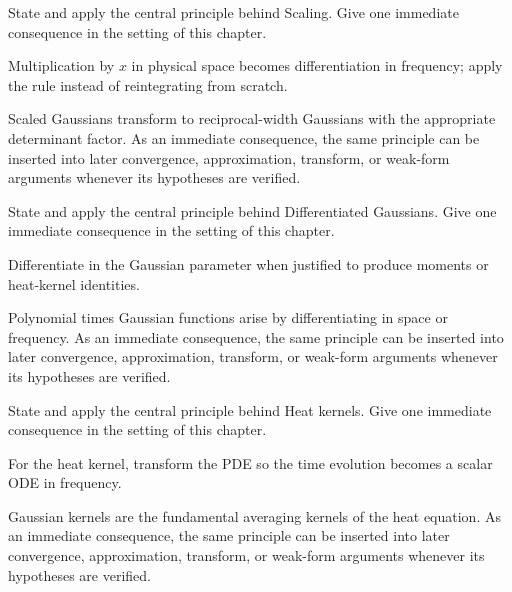 \begin{exercise}\label{exr:iii12-03}
State and apply the central principle behind Scaling. Give one immediate consequence in the setting of this chapter.
\end{exercise}
\begin{hint}
Multiplication by \(x\) in physical space becomes differentiation in frequency; apply the rule instead of reintegrating from scratch.
\end{hint}
\begin{solution}
Scaled Gaussians transform to reciprocal-width Gaussians with the appropriate determinant factor. As an immediate consequence, the same principle can be inserted into later convergence, approximation, transform, or weak-form arguments whenever its hypotheses are verified.
\end{solution}

\begin{exercise}\label{exr:iii12-04}
State and apply the central principle behind Differentiated Gaussians. Give one immediate consequence in the setting of this chapter.
\end{exercise}
\begin{hint}
Differentiate in the Gaussian parameter when justified to produce moments or heat-kernel identities.
\end{hint}
\begin{solution}
Polynomial times Gaussian functions arise by differentiating in space or frequency. As an immediate consequence, the same principle can be inserted into later convergence, approximation, transform, or weak-form arguments whenever its hypotheses are verified.
\end{solution}

\begin{exercise}\label{exr:iii12-05}
State and apply the central principle behind Heat kernels. Give one immediate consequence in the setting of this chapter.
\end{exercise}
\begin{hint}
For the heat kernel, transform the PDE so the time evolution becomes a scalar ODE in frequency.
\end{hint}
\begin{solution}
Gaussian kernels are the fundamental averaging kernels of the heat equation. As an immediate consequence, the same principle can be inserted into later convergence, approximation, transform, or weak-form arguments whenever its hypotheses are verified.
\end{solution}

